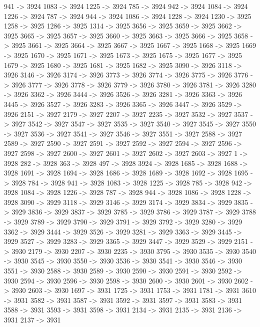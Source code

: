 {	941 -> 3924
	1083 -> 3924
	1225 -> 3924
	785 -> 3924
	942 -> 3924
	1084 -> 3924
	1226 -> 3924
	787 -> 3924
	944 -> 3924
	1086 -> 3924
	1228 -> 3924
	1230 -> 3925
	1258 -> 3925
	1286 -> 3925
	1314 -> 3925
	3656 -> 3925
	3659 -> 3925
	3662 -> 3925
	3665 -> 3925
	3657 -> 3925
	3660 -> 3925
	3663 -> 3925
	3666 -> 3925
	3658 -> 3925
	3661 -> 3925
	3664 -> 3925
	3667 -> 3925
	1667 -> 3925
	1668 -> 3925
	1669 -> 3925
	1670 -> 3925
	1671 -> 3925
	1673 -> 3925
	1675 -> 3925
	1677 -> 3925
	1679 -> 3925
	1680 -> 3925
	1681 -> 3925
	1682 -> 3925
	3090 -> 3926
	3118 -> 3926
	3146 -> 3926
	3174 -> 3926
	3773 -> 3926
	3774 -> 3926
	3775 -> 3926
	3776 -> 3926
	3777 -> 3926
	3778 -> 3926
	3779 -> 3926
	3780 -> 3926
	3781 -> 3926
	3280 -> 3926
	3362 -> 3926
	3444 -> 3926
	3526 -> 3926
	3281 -> 3926
	3363 -> 3926
	3445 -> 3926
	3527 -> 3926
	3283 -> 3926
	3365 -> 3926
	3447 -> 3926
	3529 -> 3926
	2151 -> 3927
	2179 -> 3927
	2207 -> 3927
	2235 -> 3927
	3532 -> 3927
	3537 -> 3927
	3542 -> 3927
	3547 -> 3927
	3535 -> 3927
	3540 -> 3927
	3545 -> 3927
	3550 -> 3927
	3536 -> 3927
	3541 -> 3927
	3546 -> 3927
	3551 -> 3927
	2588 -> 3927
	2589 -> 3927
	2590 -> 3927
	2591 -> 3927
	2592 -> 3927
	2594 -> 3927
	2596 -> 3927
	2598 -> 3927
	2600 -> 3927
	2601 -> 3927
	2602 -> 3927
	2603 -> 3927
	1 -> 3928
	282 -> 3928
	363 -> 3928
	497 -> 3928
	3924 -> 3928
	1685 -> 3928
	1688 -> 3928
	1691 -> 3928
	1694 -> 3928
	1686 -> 3928
	1689 -> 3928
	1692 -> 3928
	1695 -> 3928
	784 -> 3928
	941 -> 3928
	1083 -> 3928
	1225 -> 3928
	785 -> 3928
	942 -> 3928
	1084 -> 3928
	1226 -> 3928
	787 -> 3928
	944 -> 3928
	1086 -> 3928
	1228 -> 3928
	3090 -> 3929
	3118 -> 3929
	3146 -> 3929
	3174 -> 3929
	3834 -> 3929
	3835 -> 3929
	3836 -> 3929
	3837 -> 3929
	3785 -> 3929
	3786 -> 3929
	3787 -> 3929
	3788 -> 3929
	3789 -> 3929
	3790 -> 3929
	3791 -> 3929
	3792 -> 3929
	3280 -> 3929
	3362 -> 3929
	3444 -> 3929
	3526 -> 3929
	3281 -> 3929
	3363 -> 3929
	3445 -> 3929
	3527 -> 3929
	3283 -> 3929
	3365 -> 3929
	3447 -> 3929
	3529 -> 3929
	2151 -> 3930
	2179 -> 3930
	2207 -> 3930
	2235 -> 3930
	3795 -> 3930
	3535 -> 3930
	3540 -> 3930
	3545 -> 3930
	3550 -> 3930
	3536 -> 3930
	3541 -> 3930
	3546 -> 3930
	3551 -> 3930
	2588 -> 3930
	2589 -> 3930
	2590 -> 3930
	2591 -> 3930
	2592 -> 3930
	2594 -> 3930
	2596 -> 3930
	2598 -> 3930
	2600 -> 3930
	2601 -> 3930
	2602 -> 3930
	2603 -> 3930
	1697 -> 3931
	1725 -> 3931
	1753 -> 3931
	1781 -> 3931
	3610 -> 3931
	3582 -> 3931
	3587 -> 3931
	3592 -> 3931
	3597 -> 3931
	3583 -> 3931
	3588 -> 3931
	3593 -> 3931
	3598 -> 3931
	2134 -> 3931
	2135 -> 3931
	2136 -> 3931
	2137 -> 3931
}
